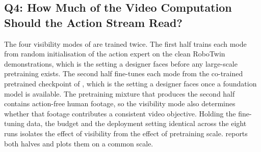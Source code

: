 \begin{table}[t]
\centering
\small
\caption{Q3, visual representation. Success rate under the protocol of
 for reconstructive and semantic latents at their native
widths and after compression by the frozen reducer. Rows marked \tgt{} carry
pre-registered target values and the unmarked row is measured. Every row
presents the backbone with 360 video tokens under the same temporal contract.}
\label{tab:q3}
\end{table}

\FloatBarrier

\subsection{Q4: How Much of the Video Computation Should the Action Stream Read?}
\label{sec:q4}

The four visibility modes of  are trained twice. The first half
trains each mode from random initialisation of the action expert on the clean
RoboTwin demonstrations, which is the setting a designer faces before any
large-scale pretraining exists. The second half fine-tunes each mode from the
co-trained pretrained checkpoint of , which is the setting a
designer faces once a foundation model is available. The pretraining mixture that
produces the second half contains action-free human footage, so the visibility
mode also determines whether that footage contributes a consistent video
objective. Holding the fine-tuning data, the budget and the deployment setting
identical across the eight runs isolates the effect of visibility from the effect
of pretraining scale.  reports both halves and  plots
them on a common scale.

